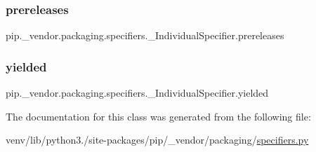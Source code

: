\subsubsection{\texorpdfstring{prereleases}{prereleases}}
{\footnotesize\ttfamily pip.\+\_\+vendor.\+packaging.\+specifiers.\+\_\+\+Individual\+Specifier.\+prereleases\hspace{0.3cm}{\ttfamily [static]}}

\mbox{\label{classpip_1_1__vendor_1_1packaging_1_1specifiers_1_1__IndividualSpecifier_a842a966349e5c985643cc5e70e648b71}} 
\subsubsection{\texorpdfstring{yielded}{yielded}}
{\footnotesize\ttfamily pip.\+\_\+vendor.\+packaging.\+specifiers.\+\_\+\+Individual\+Specifier.\+yielded\hspace{0.3cm}{\ttfamily [static]}}



The documentation for this class was generated from the following file\+:\begin{DoxyCompactItemize}
\item 
venv/lib/python3./site-\/packages/pip/\+\_\+vendor/packaging/\hyperlink{pip_2__vendor_2packaging_2specifiers_8py}{specifiers.\+py}\end{DoxyCompactItemize}

